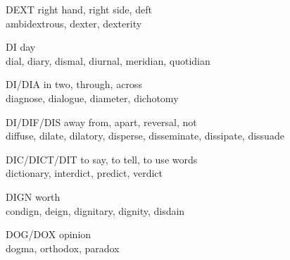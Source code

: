 \begin{flashcard}[Roots]{DEXT}
right hand, right side, deft\\
\vspace{0.2in}
ambidextrous, dexter, dexterity\\
\end{flashcard}

\begin{flashcard}[Roots]{DI}
day\\
\vspace{0.2in}
dial, diary, dismal, diurnal, meridian, quotidian\\
\end{flashcard}

\begin{flashcard}[Roots]{DI/DIA}
in two, through, across\\
\vspace{0.2in}
diagnose, dialogue, diameter, dichotomy\\
\end{flashcard}

\begin{flashcard}[Roots]{DI/DIF/DIS}
away from, apart, reversal, not\\
\vspace{0.2in}
diffuse, dilate, dilatory, disperse, disseminate, dissipate, dissuade\\
\end{flashcard}

\begin{flashcard}[Roots]{DIC/DICT/DIT}
to say, to tell, to use words\\
\vspace{0.2in}
dictionary, interdict, predict, verdict\\
\end{flashcard}

\begin{flashcard}[Roots]{DIGN}
worth\\
\vspace{0.2in}
condign, deign, dignitary, dignity, disdain\\
\end{flashcard}

\begin{flashcard}[Roots]{DOG/DOX}
opinion\\
\vspace{0.2in}
dogma, orthodox, paradox\\
\end{flashcard}

